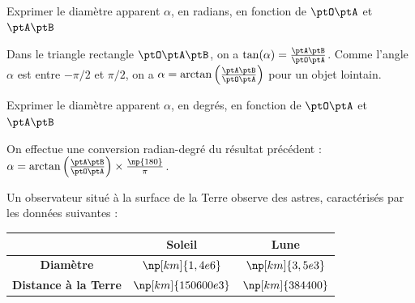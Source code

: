 \debutEntrainement


\begin{enonce}
Exprimer le diamètre apparent $\alpha$, en radians, en fonction de $\ptO\ptA$ et $\ptA\ptB$
\end{enonce}

\reponse{$\arctan\left(\frac{\ptA\ptB}{\ptO\ptA}\right)$} 

\begin{corrige}
Dans le triangle rectangle $\ptO\ptA\ptB$, on a $\tan(\alpha)=\frac{\ptA\ptB}{\ptO\ptA}$. 
Comme l'angle $\alpha$ est entre $-\pi/2$ et $\pi/2$, on a
$\alpha=\arctan\left(\frac{\ptA\ptB}{\ptO\ptA}\right)$ pour un objet lointain.
\end{corrige}





\begin{enonce}
Exprimer le diamètre apparent $\alpha$, en degrés, en fonction de $\ptO\ptA$ et $\ptA\ptB$
\end{enonce}


\begin{corrige}
On effectue une conversion radian-degré du résultat précédent : $\alpha = \arctan\left(\frac{\ptA\ptB}{\ptO\ptA}\right) \times \frac{\np{180}}{\pi}$.
\end{corrige}
 

 

\pauseEntrainement
 
\bigskip
Un observateur situé à la surface de la Terre observe des astres, caractérisés par les données suivantes :

\begin{center}
\renewcommand*{\arraystretch}{1.4}
\begin{tabular}{ |c|c|c| } 
 \hline
  & \textbf{Soleil} & \textbf{Lune} \\
 \hline 
 \textbf{Diamètre} & $\np[km]{1,4e{6}}$  & $\np[km]{3,5e{3}}$ \\
\hline 
 \textbf{Distance à la Terre} & $\np[km]{150 600e{3}}$ & $\np[km]{384 400}$ \\
 \hline
\end{tabular}
\renewcommand*{\arraystretch}{1}
\end{center}

